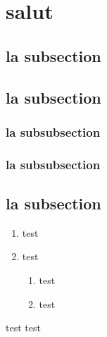 \documentclass{classe-tex3R-2-1}
\begin{document}

\section{salut}

\subsection{la subsection}

\subsection{la subsection}

\subsubsection{la subsubsection}

\subsubsection{la subsubsection}

\subsection{la subsection}




\titreactivite

\titrecours

\titrecorrige

\titreDM

\titreDS

\titreflash

\titreTD

\titreinterro

\begin{enumerate}
  \item test
  \item test
  \begin{enumerate}
    \item test
    \item test
  \end{enumerate}
\end{enumerate}


\begin{tasks}[style=enumerate]
  \task test
  \task test
\end{tasks}
\end{document}
